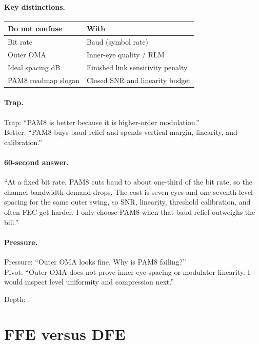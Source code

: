 \paragraph{Key distinctions.}
\begin{center}
\footnotesize
\begin{tabular}{@{}ll@{}}
\toprule
Do not confuse & With \\
\midrule
Bit rate & Baud (symbol rate) \\
Outer OMA & Inner-eye quality / RLM \\
Ideal spacing dB & Finished link sensitivity penalty \\
PAM8 roadmap slogan & Closed SNR and linearity budget \\
\bottomrule
\end{tabular}
\end{center}

\paragraph{Trap.}
Trap: ``PAM8 is better because it is higher-order modulation.''\\
Better: ``PAM8 buys baud relief and spends vertical margin, linearity, and
calibration.''

\paragraph{60-second answer.}
``At a fixed bit rate, PAM8 cuts baud to about one-third of the bit rate, so
the channel bandwidth demand drops. The cost is seven eyes and one-seventh
level spacing for the same outer swing, so SNR, linearity, threshold
calibration, and often FEC get harder. I only choose PAM8 when that baud
relief outweighs the bill.''

\paragraph{Pressure.}
Pressure: ``Outer OMA looks fine. Why is PAM8 failing?''\\
Pivot: ``Outer OMA does not prove inner-eye spacing or modulator linearity. I
would inspect level uniformity and compression next.''

\footnotesize Depth: .

\clearpage
\section{FFE versus DFE}
\label{sec:cheat-eq}

